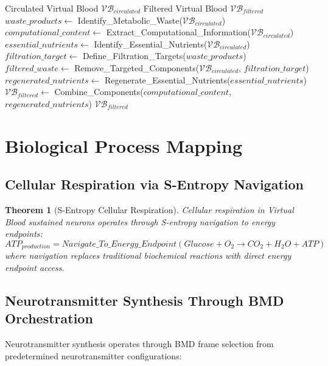 \documentclass[12pt,a4paper]{article}
\newtheorem{theorem}{Theorem}
\begin{document}
\begin{algorithm}
\caption{S-Entropy Virtual Blood Filtration}
\begin{algorithmic}[1]
\Require Circulated Virtual Blood $\mathcal{VB}_{circulated}$
\Ensure Filtered Virtual Blood $\mathcal{VB}_{filtered}$
\State $waste\_products \leftarrow$ Identify\_Metabolic\_Waste($\mathcal{VB}_{circulated}$)
\State $computational\_content \leftarrow$ Extract\_Computational\_Information($\mathcal{VB}_{circulated}$)
\State $essential\_nutrients \leftarrow$ Identify\_Essential\_Nutrients($\mathcal{VB}_{circulated}$)
\State $filtration\_target \leftarrow$ Define\_Filtration\_Targets($waste\_products$)
\State $filtered\_waste \leftarrow$ Remove\_Targeted\_Components($\mathcal{VB}_{circulated}$, $filtration\_target$)
\State $regenerated\_nutrients \leftarrow$ Regenerate\_Essential\_Nutrients($essential\_nutrients$)
\State $\mathcal{VB}_{filtered} \leftarrow$ Combine\_Components($computational\_content$, $regenerated\_nutrients$)
\State \Return $\mathcal{VB}_{filtered}$
\end{algorithmic}
\end{algorithm}

\section{Biological Process Mapping}

\subsection{Cellular Respiration via S-Entropy Navigation}

\begin{theorem}[S-Entropy Cellular Respiration]
Cellular respiration in Virtual Blood sustained neurons operates through S-entropy navigation to energy endpoints:
\begin{equation}
ATP_{production} = Navigate\_To\_Energy\_Endpoint(Glucose + O_2 \rightarrow CO_2 + H_2O + ATP)
\end{equation}
where navigation replaces traditional biochemical reactions with direct energy endpoint access.
\end{theorem}

\subsection{Neurotransmitter Synthesis Through BMD Orchestration}

Neurotransmitter synthesis operates through BMD frame selection from predetermined neurotransmitter configurations:
\end{document}
